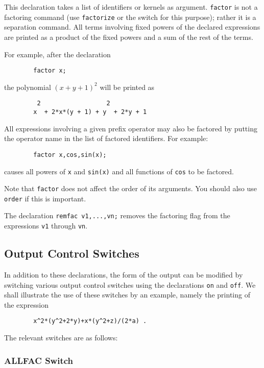 This declaration takes a list of identifiers or kernels
as argument.
\texttt{factor}
is not a factoring command
(use \texttt{factorize} or the  switch for this purpose); rather it
is a separation command.  All terms involving fixed powers of the declared
expressions are printed as a product of the fixed powers and a sum of the
rest of the terms.

For example, after the declaration
\begin{verbatim}
        factor x;
\end{verbatim}
the polynomial $(x+y+1)^{2}$ will be printed as
\begin{verbatim}
         2                  2
        x  + 2*x*(y + 1) + y  + 2*y + 1
\end{verbatim}
All expressions involving a given prefix operator may also be factored by
putting the operator name in the list of factored identifiers. For example:
\begin{verbatim}
        factor x,cos,sin(x);
\end{verbatim}
causes all powers of \texttt{x} and \texttt{sin(x)} and all functions of
\texttt{cos} to be factored.

Note that \texttt{factor} does not affect the order of its arguments.  You
should also use \texttt{order} if this is important.

\hypertarget{command:REMFAC}{}
The declaration \texttt{remfac v1,...,vn;} removes the
factoring flag from the expressions \texttt{v1} through \texttt{vn}.

\subsection{Output Control Switches}
\label{sec-output}
In addition to these declarations, the form of the output can be modified
by switching various output control switches using the declarations
\texttt{on} and \texttt{off}.  We shall illustrate the use of these switches by an
example, namely the printing of the expression
\begin{verbatim}
        x^2*(y^2+2*y)+x*(y^2+z)/(2*a) .
\end{verbatim}
The relevant switches are as follows:

\subsubsection{ALLFAC Switch}
\hypertarget{switch:ALLFAC}{}

